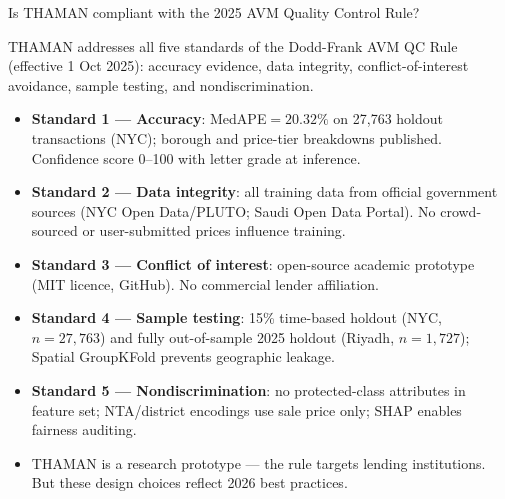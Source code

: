 \documentclass[11pt, a4paper, twoside]{article}
\begin{document}
\begin{question}{Is THAMAN compliant with the 2025 AVM Quality Control Rule?}
\begin{shortanswer}
THAMAN addresses all five standards of the Dodd-Frank AVM QC Rule
(effective 1 Oct 2025): accuracy evidence, data integrity, conflict-of-interest
avoidance, sample testing, and nondiscrimination.
\end{shortanswer}

\begin{detail}
\begin{itemize}
  \item \textbf{Standard 1 --- Accuracy}: MedAPE$=20.32\%$ on 27,763
        holdout transactions (NYC); borough and price-tier breakdowns
        published. Confidence score 0--100 with letter grade at inference.
  \item \textbf{Standard 2 --- Data integrity}: all training data from
        official government sources (NYC Open Data/PLUTO; Saudi Open Data
        Portal). No crowd-sourced or user-submitted prices influence training.
  \item \textbf{Standard 3 --- Conflict of interest}: open-source academic
        prototype (MIT licence, GitHub). No commercial lender affiliation.
  \item \textbf{Standard 4 --- Sample testing}: 15\% time-based holdout
        (NYC, $n=27{,}763$) and fully out-of-sample 2025 holdout (Riyadh,
        $n=1{,}727$); Spatial GroupKFold prevents geographic leakage.
  \item \textbf{Standard 5 --- Nondiscrimination}: no protected-class
        attributes in feature set; NTA/district encodings use sale price
        only; SHAP enables fairness auditing.
  \item THAMAN is a research prototype --- the rule targets lending
        institutions. But these design choices reflect 2026 best practices.
\end{itemize}
\end{detail}
\end{question}

\bigskip
\end{document}
